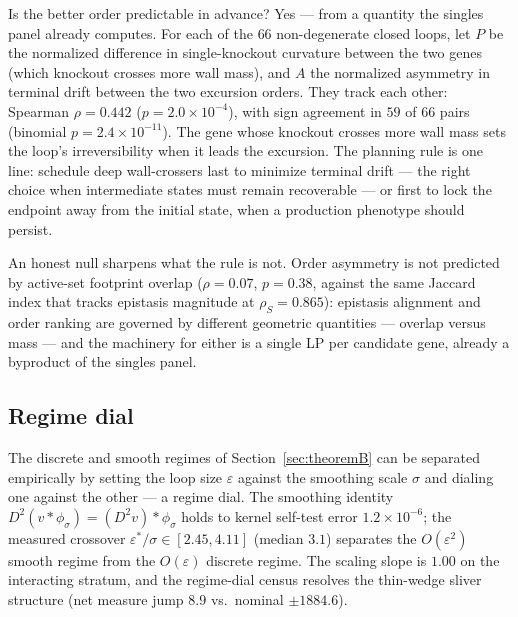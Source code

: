 \documentclass[11pt,a4paper]{article}
\theoremstyle{plain}
\theoremstyle{definition}
\theoremstyle{remark}
\begin{document}
Is the better order predictable in advance? Yes --- from a
quantity the singles panel already computes. For each of the $66$
non-degenerate closed loops, let $P$ be the normalized difference
in single-knockout curvature between the two genes (which knockout
crosses more wall mass), and $A$ the normalized asymmetry in
terminal drift between the two excursion orders. They track each
other: Spearman $\rho = 0.442$ ($p = 2.0 \times 10^{-4}$), with
sign agreement in $59$ of $66$ pairs (binomial $p = 2.4 \times
10^{-11}$). The gene whose knockout crosses more wall mass sets
the loop's irreversibility when it leads the excursion. The
planning rule is one line: schedule deep wall-crossers last to
minimize terminal drift --- the right choice when intermediate
states must remain recoverable --- or first to lock the endpoint
away from the initial state, when a production phenotype should
persist.

An honest null sharpens what the rule is not. Order asymmetry is
not predicted by active-set footprint overlap ($\rho = 0.07$,
$p = 0.38$, against the same Jaccard index that tracks epistasis
magnitude at $\rho_S = 0.865$): epistasis alignment and order
ranking are governed by different geometric quantities ---
overlap versus mass --- and the machinery for either is a single
LP per candidate gene, already a byproduct of the singles panel.
\subsection{Regime dial}
\label{sec:m4}
The discrete and smooth regimes of Section~\ref{sec:theoremB} can be
separated empirically by setting the loop size $\varepsilon$ against
the smoothing scale $\sigma$ and dialing one against the other --- a
regime dial. The smoothing identity $D^2(v * \phi_\sigma) = (D^2 v) * \phi_\sigma$
holds to kernel self-test error $1.2 \times 10^{-6}$; the measured
crossover $\varepsilon^*/\sigma \in [2.45, 4.11]$ (median $3.1$)
separates the $O(\varepsilon^2)$ smooth regime from the
$O(\varepsilon)$ discrete regime. The scaling slope is $1.00$ on the
interacting stratum, and the regime-dial census resolves the
thin-wedge sliver structure (net measure jump $8.9$ vs.\ nominal
$\pm 1884.6$).
\end{document}

